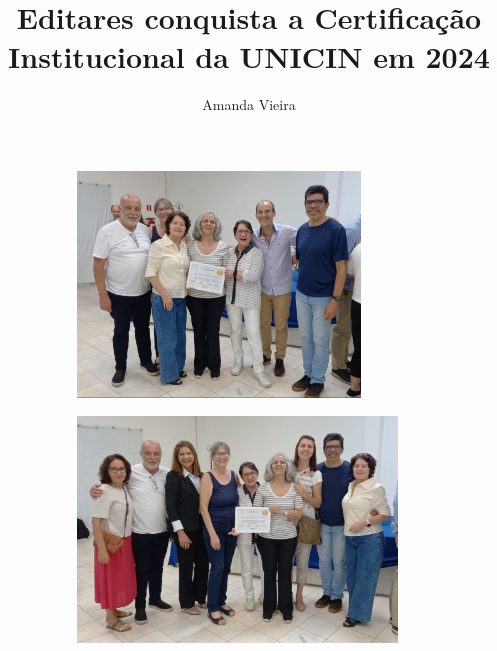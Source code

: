 \documentclass{gescons}
\author{Amanda Vieira}
\title{Editares conquista a Certificação Institucional da UNICIN em 2024}
\begin{document}
    \makeentrevistatitle


    




\begin{figure}[h]
  \centering
  \begin{subfigure}[b]{0.49\textwidth}
    \includegraphics[height=60mm,keepaspectratio]{articles/resumo/fotos/materia3/d94f6571-cf63-48d2-976b-507cbf8cafc5.jpg}
\end{subfigure}
\begin{subfigure}[b]{0.49\textwidth}
    \includegraphics[height=60mm,keepaspectratio]{articles/resumo/fotos/materia3/06eb15bb-01a3-43d5-84e2-67f62c13a53e.jpg}
  \end{subfigure}
\end{figure}
\end{document}
